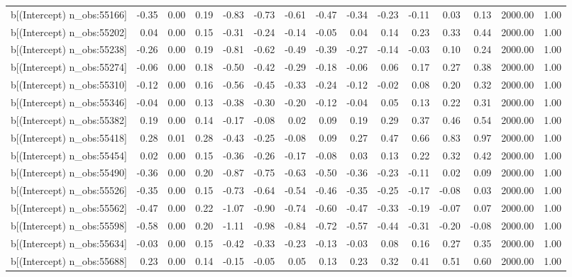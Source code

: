 \begin{table}[ht]
\begin{tabular}{rrrrrrrrrrrrrrr}
  b[(Intercept) n\_obs:55166] & -0.35 & 0.00 & 0.19 & -0.83 & -0.73 & -0.61 & -0.47 & -0.34 & -0.23 & -0.11 & 0.03 & 0.13 & 2000.00 & 1.00 \\ 
  b[(Intercept) n\_obs:55202] & 0.04 & 0.00 & 0.15 & -0.31 & -0.24 & -0.14 & -0.05 & 0.04 & 0.14 & 0.23 & 0.33 & 0.44 & 2000.00 & 1.00 \\ 
  b[(Intercept) n\_obs:55238] & -0.26 & 0.00 & 0.19 & -0.81 & -0.62 & -0.49 & -0.39 & -0.27 & -0.14 & -0.03 & 0.10 & 0.24 & 2000.00 & 1.00 \\ 
  b[(Intercept) n\_obs:55274] & -0.06 & 0.00 & 0.18 & -0.50 & -0.42 & -0.29 & -0.18 & -0.06 & 0.06 & 0.17 & 0.27 & 0.38 & 2000.00 & 1.00 \\ 
  b[(Intercept) n\_obs:55310] & -0.12 & 0.00 & 0.16 & -0.56 & -0.45 & -0.33 & -0.24 & -0.12 & -0.02 & 0.08 & 0.20 & 0.32 & 2000.00 & 1.00 \\ 
  b[(Intercept) n\_obs:55346] & -0.04 & 0.00 & 0.13 & -0.38 & -0.30 & -0.20 & -0.12 & -0.04 & 0.05 & 0.13 & 0.22 & 0.31 & 2000.00 & 1.00 \\ 
  b[(Intercept) n\_obs:55382] & 0.19 & 0.00 & 0.14 & -0.17 & -0.08 & 0.02 & 0.09 & 0.19 & 0.29 & 0.37 & 0.46 & 0.54 & 2000.00 & 1.00 \\ 
  b[(Intercept) n\_obs:55418] & 0.28 & 0.01 & 0.28 & -0.43 & -0.25 & -0.08 & 0.09 & 0.27 & 0.47 & 0.66 & 0.83 & 0.97 & 2000.00 & 1.00 \\ 
  b[(Intercept) n\_obs:55454] & 0.02 & 0.00 & 0.15 & -0.36 & -0.26 & -0.17 & -0.08 & 0.03 & 0.13 & 0.22 & 0.32 & 0.42 & 2000.00 & 1.00 \\ 
  b[(Intercept) n\_obs:55490] & -0.36 & 0.00 & 0.20 & -0.87 & -0.75 & -0.63 & -0.50 & -0.36 & -0.23 & -0.11 & 0.02 & 0.09 & 2000.00 & 1.00 \\ 
  b[(Intercept) n\_obs:55526] & -0.35 & 0.00 & 0.15 & -0.73 & -0.64 & -0.54 & -0.46 & -0.35 & -0.25 & -0.17 & -0.08 & 0.03 & 2000.00 & 1.00 \\ 
  b[(Intercept) n\_obs:55562] & -0.47 & 0.00 & 0.22 & -1.07 & -0.90 & -0.74 & -0.60 & -0.47 & -0.33 & -0.19 & -0.07 & 0.07 & 2000.00 & 1.00 \\ 
  b[(Intercept) n\_obs:55598] & -0.58 & 0.00 & 0.20 & -1.11 & -0.98 & -0.84 & -0.72 & -0.57 & -0.44 & -0.31 & -0.20 & -0.08 & 2000.00 & 1.00 \\ 
  b[(Intercept) n\_obs:55634] & -0.03 & 0.00 & 0.15 & -0.42 & -0.33 & -0.23 & -0.13 & -0.03 & 0.08 & 0.16 & 0.27 & 0.35 & 2000.00 & 1.00 \\ 
  b[(Intercept) n\_obs:55688] & 0.23 & 0.00 & 0.14 & -0.15 & -0.05 & 0.05 & 0.13 & 0.23 & 0.32 & 0.41 & 0.51 & 0.60 & 2000.00 & 1.00 \\ 

\end{tabular}
\end{table}

